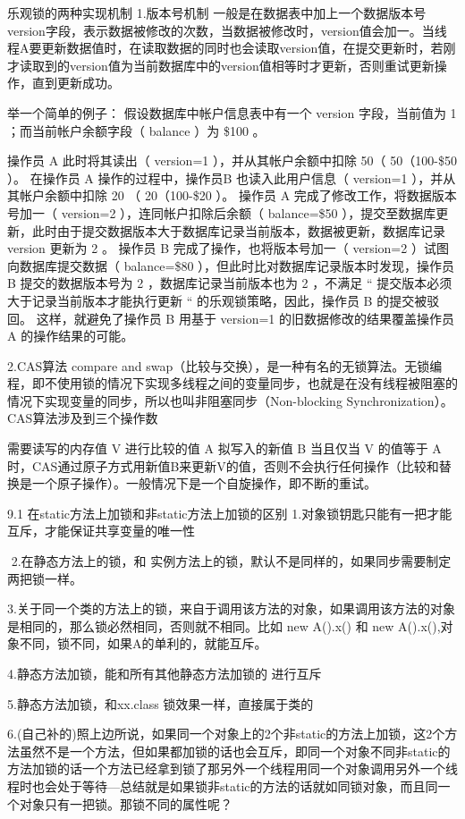 \documentclass[UTF8]{ctexart}
\begin{document}
乐观锁的两种实现机制
1.版本号机制
一般是在数据表中加上一个数据版本号version字段，表示数据被修改的次数，当数据被修改时，version值会加一。当线程A要更新数据值时，在读取数据的同时也会读取version值，在提交更新时，若刚才读取到的version值为当前数据库中的version值相等时才更新，否则重试更新操作，直到更新成功。

举一个简单的例子： 假设数据库中帐户信息表中有一个 version 字段，当前值为 1 ；而当前帐户余额字段（ balance ）为 \$100 。

操作员 A 此时将其读出（ version=1 ），并从其帐户余额中扣除 50（ 50（100-\$50 ）。
在操作员 A 操作的过程中，操作员B 也读入此用户信息（ version=1 ），并从其帐户余额中扣除 20 （ 20（100-\$20 ）。
操作员 A 完成了修改工作，将数据版本号加一（ version=2 ），连同帐户扣除后余额（ balance=\$50 ），提交至数据库更新，此时由于提交数据版本大于数据库记录当前版本，数据被更新，数据库记录 version 更新为 2 。
操作员 B 完成了操作，也将版本号加一（ version=2 ）试图向数据库提交数据（ balance=\$80 ），但此时比对数据库记录版本时发现，操作员 B 提交的数据版本号为 2 ，数据库记录当前版本也为 2 ，不满足 “ 提交版本必须大于记录当前版本才能执行更新 “ 的乐观锁策略，因此，操作员 B 的提交被驳回。
这样，就避免了操作员 B 用基于 version=1 的旧数据修改的结果覆盖操作员A 的操作结果的可能。

2.CAS算法
compare and swap（比较与交换），是一种有名的无锁算法。无锁编程，即不使用锁的情况下实现多线程之间的变量同步，也就是在没有线程被阻塞的情况下实现变量的同步，所以也叫非阻塞同步（Non-blocking Synchronization）。CAS算法涉及到三个操作数

需要读写的内存值 V
进行比较的值 A
拟写入的新值 B
当且仅当 V 的值等于 A时，CAS通过原子方式用新值B来更新V的值，否则不会执行任何操作（比较和替换是一个原子操作）。一般情况下是一个自旋操作，即不断的重试。

9.1 在static方法上加锁和非static方法上加锁的区别
1.对象锁钥匙只能有一把才能互斥，才能保证共享变量的唯一性

​ 2.在静态方法上的锁，和 实例方法上的锁，默认不是同样的，如果同步需要制定两把锁一样。

​ 3.关于同一个类的方法上的锁，来自于调用该方法的对象，如果调用该方法的对象是相同的，那么锁必然相同，否则就不相同。比如 new A().x() 和 new A().x(),对象不同，锁不同，如果A的单利的，就能互斥。

​4.静态方法加锁，能和所有其他静态方法加锁的 进行互斥

​5.静态方法加锁，和xx.class 锁效果一样，直接属于类的

6.(自己补的)照上边所说，如果同一个对象上的2个非static的方法上加锁，这2个方法虽然不是一个方法，但如果都加锁的话也会互斥，即同一个对象不同非static的方法加锁的话一个方法已经拿到锁了那另外一个线程用同一个对象调用另外一个线程时也会处于等待---总结就是如果锁非static的方法的话就如同锁对象，而且同一个对象只有一把锁。那锁不同的属性呢？
\end{document}
